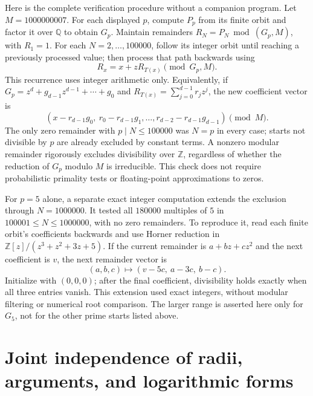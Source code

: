 \documentclass[11pt,a4paper]{article}
\theoremstyle{definition}
\theoremstyle{remark}
\numberwithin{equation}{section}
\begin{document}
Here is the complete verification procedure without a companion program.
Let $M=1000000007$. For each displayed $p$, compute $P_p$ from its finite
orbit and factor it over $\mathbb Q$ to obtain $G_p$.
Maintain remainders $R_N=P_N\bmod(G_p,M)$, with $R_1=1$.
For each $N=2,\ldots,100000$, follow its integer orbit until reaching a
previously processed value; then process that path backwards using
\[
 R_x=x+zR_{T(x)}\pmod{G_p,M}.
\]
This recurrence uses integer arithmetic only. Equivalently, if
$G_p=z^d+g_{d-1}z^{d-1}+\cdots+g_0$ and
$R_{T(x)}=\sum_{j=0}^{d-1}r_jz^j$, the new coefficient vector is
\[
 (x-r_{d-1}g_0,\ r_0-r_{d-1}g_1,\ldots,
 r_{d-2}-r_{d-1}g_{d-1})\pmod M.
\]
The only zero remainder with $p\mid N\leq100000$ was $N=p$ in every
case; starts not divisible by $p$ are already excluded by constant terms.
A nonzero modular remainder rigorously excludes divisibility over
$\mathbb Z$, regardless of whether the reduction of $G_p$ modulo $M$
is irreducible. This check does not require probabilistic primality tests
or floating-point approximations to zeros.

For $p=5$ alone, a separate exact integer computation extends the exclusion
through $N=1000000$. It tested all $180000$ multiples of $5$ in
$100001\leq N\leq1000000$, with no zero remainders. To reproduce it,
read each finite orbit's coefficients backwards and use Horner reduction
in $\mathbb Z[z]/(z^3+z^2+3z+5)$. If the current remainder is
$a+bz+cz^2$ and the next coefficient is $v$, the next remainder vector is
\[
 (a,b,c)\longmapsto(v-5c,\ a-3c,\ b-c).
\]
Initialize with $(0,0,0)$; after the final coefficient, divisibility holds
exactly when all three entries vanish. This extension used exact integers,
without modular filtering or numerical root comparison. The larger range
is asserted here only for $G_5$, not for the other prime starts listed above.



\section{Joint independence of radii, arguments, and logarithmic forms}
\label{C:sec:joint-arithmetic}
\end{document}
